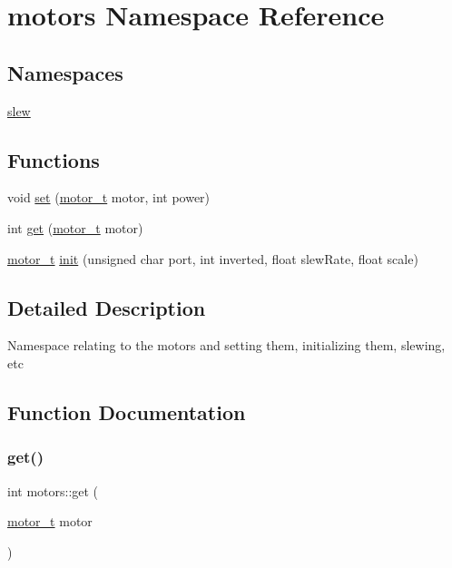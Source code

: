 \hypertarget{namespacemotors}{}\section{motors Namespace Reference}
\label{namespacemotors}
\subsection*{Namespaces}
\begin{DoxyCompactItemize}
\item 
 \hyperlink{namespacemotors_1_1slew}{slew}
\end{DoxyCompactItemize}
\subsection*{Functions}
\begin{DoxyCompactItemize}
\item 
void \hyperlink{namespacemotors_a1d018a7911884ab27f16d91f8c65d581}{set} (\hyperlink{structmotor__t}{motor\+\_\+t} motor, int power)
\item 
int \hyperlink{namespacemotors_a8675edaee02f9a8cfa61a4efa0d92166}{get} (\hyperlink{structmotor__t}{motor\+\_\+t} motor)
\item 
\hyperlink{structmotor__t}{motor\+\_\+t} \hyperlink{namespacemotors_ac24174d8f1da14c7577c91249e35c2e6}{init} (unsigned char port, int inverted, float slew\+Rate, float scale)
\end{DoxyCompactItemize}


\subsection{Detailed Description}
Namespace relating to the motors and setting them, initializing them, slewing, etc 

\subsection{Function Documentation}
\mbox{\label{namespacemotors_a8675edaee02f9a8cfa61a4efa0d92166}} 
\subsubsection{\texorpdfstring{get()}{get()}}
{\footnotesize\ttfamily int motors\+::get (\begin{DoxyParamCaption}\item[{\hyperlink{structmotor__t}{motor\+\_\+t}}]{motor }\end{DoxyParamCaption})}

